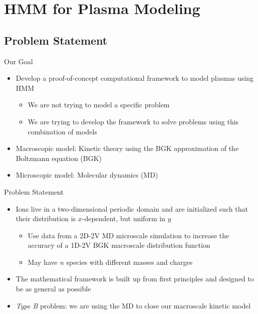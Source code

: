 \documentclass{beamer}
\begin{document}
	\section{HMM for Plasma Modeling}
	\subsection{Problem Statement}
	\begin{frame}{Our Goal}
		\begin{itemize}
			\item  Develop a proof-of-concept computational framework to model plasmas using HMM\vspace{1em}
			\begin{itemize}
				\item  We are not trying to model a specific problem\vspace{1em}				\item  We are trying to develop the framework to solve problems using this combination of models\vspace{1em}
			\end{itemize}
			\item  Macroscopic model: Kinetic theory using the BGK approximation of the Boltzmann equation (BGK)\vspace{1em}
			\item  Microscopic model: Molecular dynamics (MD)
		\end{itemize}
	\end{frame}
	
	\begin{frame}{Problem Statement}
		\begin{itemize}
			\item  Ions live in a two-dimensional periodic domain and are initialized such that their distribution is $x$-dependent, but uniform in $y$
			\vspace{0.5em}
			\begin{itemize}
				\item Use data from a 2D-2V MD microscale simulation to increase the accuracy of a 1D-2V BGK macroscale distribution function
				\vspace{0.5em}
				\item  May have $n$ species with different masses and charges
				\vspace{0.5em}
			\end{itemize}
			\vspace{0.5em}
			\item  The mathematical framework is built up from first principles and designed to be as general as possible
			\vspace{0.5em}
			\item  \emph{Type B} problem: we are using the MD to close our macroscale kinetic model
		\end{itemize}
	\end{frame}
	
\end{document}
